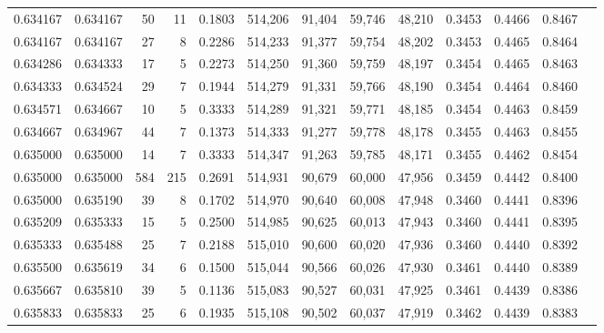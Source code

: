 \begin{tabular}{rrrrrrrrrrrrr}
0.634167 & 0.634167 &    50 &  11 &                                     0.1803 & 514,206 &  91,404 &  59,746 &  48,210 & 0.3453 & 0.4466 & 0.8467 \\
0.634167 & 0.634167 &    27 &   8 &                                     0.2286 & 514,233 &  91,377 &  59,754 &  48,202 & 0.3453 & 0.4465 & 0.8464 \\
0.634286 & 0.634333 &    17 &   5 &                                     0.2273 & 514,250 &  91,360 &  59,759 &  48,197 & 0.3454 & 0.4465 & 0.8463 \\
0.634333 & 0.634524 &    29 &   7 &                                     0.1944 & 514,279 &  91,331 &  59,766 &  48,190 & 0.3454 & 0.4464 & 0.8460 \\
0.634571 & 0.634667 &    10 &   5 &                                     0.3333 & 514,289 &  91,321 &  59,771 &  48,185 & 0.3454 & 0.4463 & 0.8459 \\
0.634667 & 0.634967 &    44 &   7 &                                     0.1373 & 514,333 &  91,277 &  59,778 &  48,178 & 0.3455 & 0.4463 & 0.8455 \\
0.635000 & 0.635000 &    14 &   7 &                                     0.3333 & 514,347 &  91,263 &  59,785 &  48,171 & 0.3455 & 0.4462 & 0.8454 \\
0.635000 & 0.635000 &   584 & 215 &                                     0.2691 & 514,931 &  90,679 &  60,000 &  47,956 & 0.3459 & 0.4442 & 0.8400 \\
0.635000 & 0.635190 &    39 &   8 &                                     0.1702 & 514,970 &  90,640 &  60,008 &  47,948 & 0.3460 & 0.4441 & 0.8396 \\
0.635209 & 0.635333 &    15 &   5 &                                     0.2500 & 514,985 &  90,625 &  60,013 &  47,943 & 0.3460 & 0.4441 & 0.8395 \\
0.635333 & 0.635488 &    25 &   7 &                                     0.2188 & 515,010 &  90,600 &  60,020 &  47,936 & 0.3460 & 0.4440 & 0.8392 \\
0.635500 & 0.635619 &    34 &   6 &                                     0.1500 & 515,044 &  90,566 &  60,026 &  47,930 & 0.3461 & 0.4440 & 0.8389 \\
0.635667 & 0.635810 &    39 &   5 &                                     0.1136 & 515,083 &  90,527 &  60,031 &  47,925 & 0.3461 & 0.4439 & 0.8386 \\
0.635833 & 0.635833 &    25 &   6 &                                     0.1935 & 515,108 &  90,502 &  60,037 &  47,919 & 0.3462 & 0.4439 & 0.8383 \\

\end{tabular}
